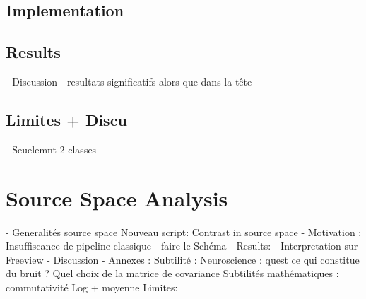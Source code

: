 \subsection{Implementation}



\subsection{Results}
- Discussion
- resultats significatifs alors que dans la tête


\subsection{Limites + Discu}

- Seuelemnt 2 classes

\section{Source Space Analysis}

- Generalités source space
Nouveau script: Contrast in source space
- Motivation : Insuffiscance de pipeline classique
- faire le Schéma
- Results:
- Interpretation sur Freeview
- Discussion
- Annexes : Subtilité :
Neuroscience : quest ce qui constitue du bruit ? Quel choix de la matrice de covariance
Subtilités mathématiques :  commutativité Log + moyenne
Limites:
